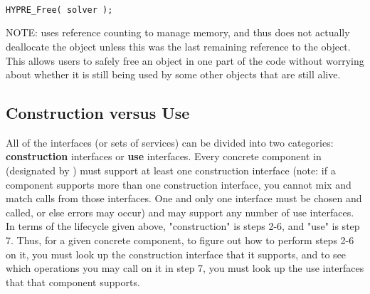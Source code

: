 \begin{enumerate}
\begin{display}
\begin{verbatim}

HYPRE_Free( solver );

\end{verbatim}
\end{display}

NOTE: \hypre{} uses reference counting to
manage memory, and 
thus  does not actually deallocate the object unless this was the
last remaining reference 
to the object. This allows users to safely free an object in one part of the
code without worrying about 
whether it is still being used by some other objects that are still alive.

\end{enumerate}

\subsection{Construction versus Use}

All of the \hypre{} interfaces (or sets of services) can be divided into two
categories: {\bf construction} 
interfaces or {\bf use} interfaces. Every concrete component in \hypre{} 
(designated by
) must support at 
least one construction interface (note: if a component supports more than one
construction interface, you 
cannot mix and match calls from those interfaces. One and only one interface
must be chosen and called, or 
else errors may occur) and may support any number of use interfaces. In terms
of the lifecycle given above, 
"construction" is steps 2-6, and "use" is step 7. Thus, for a given concrete
component, to figure out how to 
perform steps 2-6 on it, you must look up the \hypre{} construction interface that
it supports, and to see 
which operations you may call on it in step 7, you must look up the use
interfaces that that component 
supports.

